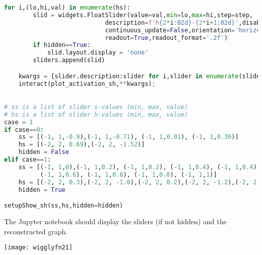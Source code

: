 \begin{lstlisting}[language=Python]
    for i,(lo,hi,val) in enumerate(hs):
        slid = widgets.FloatSlider(value=val,min=lo,max=hi,step=step,
                            description=f'h{2*i:02d}-{2*i+1:02d}',disabled=False,
                            continuous_update=False,orientation='horizontal',
                            readout=True,readout_format='.2f')
        if hidden==True:
            slid.layout.display = 'none'
        sliders.append(slid)

    kwargs = {slider.description:slider for i,slider in enumerate(sliders)}
    interact(plot_activation_sh,**kwargs);

    
# ss is a list of slider s-values (min, max, value)
# hs is a list of slider h-values (min, max, value)
case = 1
if case==0:
    ss = [(-1, 1,-0.9),(-1, 1,-0.71), (-1, 1,0.01), (-1, 1,0.36)]
    hs = [(-2, 2, 0.69),(-2, 2, -1.52)]
    hidden = False
elif case==1:
    ss = [(-1, 1,0),(-1, 1,0.2), (-1, 1,0.2), (-1, 1,0.4), (-1, 1,0.4), (-1, 1,0.6), 
          (-1, 1,0.6), (-1, 1,0.8), (-1, 1,0.8), (-1, 1,1)]
    hs = [(-2, 2, 0.3),(-2, 2, -1.0),(-2, 2, 0.2),(-2, 2, -1.2),(-2, 2, -0.3)]
    hidden = True

setupShow_sh(ss,hs,hidden=hidden)    
\end{lstlisting}

The Jupyter notebook should display the sliders (if not hidden) and the reconstructed graph.

{\centering \texttt{[image: wigglyfn21]} \par}

